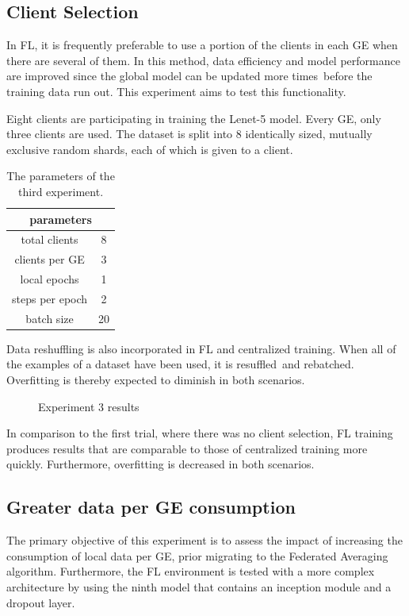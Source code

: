 \subsection{Client Selection}
In FL, it is frequently preferable to use a portion of the clients in each GE when there are several of them. In this method, data efficiency and model performance are improved since the global model can be updated more times before the training data run out. This experiment aims to test this functionality.

Eight clients are participating in training the Lenet-5 model. Every GE, only three clients are used. The dataset is split into 8 identically sized, mutually exclusive random shards, each of which is given to a client.

\begin{table}[H]
    \center
    \begin{tabular}{ | c | c | }
        \hline
        \multicolumn{2}{|c|}{ parameters } \\
        \hline\hline
         total clients & 8 \\
        \hline
        clients per GE & 3 \\
        \hline
        local epochs & 1 \\
        \hline
        steps per epoch & 2 \\
        \hline
        batch size & 20 \\
        \hline
    \end{tabular}
    \caption[Experiment 3 Parameters]{The parameters of the third experiment.}
    \label{table:Experiment 3 parameters}
\end{table}

Data reshuffling is also incorporated in FL and centralized training. When all of the examples of a dataset have been used, it is resuffled and rebatched. Overfitting is thereby expected to diminish in both scenarios.

\begin{figure}[H]
    \center
    
    \caption[Experiment 3 results]{Experiment 3 results}
    \label{fig:Experiment 3 results}
\end{figure}

In comparison to the first trial, where there was no client selection, FL training produces results that are comparable to those of centralized training more quickly. Furthermore, overfitting is decreased in both scenarios.

\subsection{Greater data per GE consumption}
The primary objective of this experiment is to assess the impact of increasing the consumption of local data per GE, prior migrating to the Federated Averaging algorithm. Furthermore, the FL environment is tested with a more complex architecture by using the ninth model that contains an inception module and a dropout layer.

